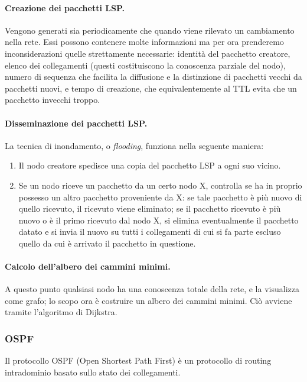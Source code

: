             \paragraph{Creazione dei pacchetti LSP.} Vengono generati sia periodicamente che quando viene rilevato un cambiamento nella rete. Essi possono contenere molte informazioni ma per ora prenderemo inconsiderazioni quelle strettamente necessarie: identità del pacchetto creatore, elenco dei collegamenti (questi costituiscono la conoscenza parziale del nodo), numero di sequenza che facilita la diffusione e la distinzione di pacchetti vecchi da pacchetti nuovi, e tempo di creazione, che equivalentemente al TTL evita che un pacchetto invecchi troppo.
            
            \paragraph{Disseminazione dei pacchetti LSP.} La tecnica di inondamento, o \textit{flooding}, funziona nella seguente maniera:
            \begin{enumerate}
                \item Il nodo creatore spedisce una copia del pacchetto LSP a ogni suo vicino.
                \item Se un nodo riceve un pacchetto da un certo nodo X, controlla se ha in proprio possesso un altro pacchetto proveniente da X: se tale pacchetto è più nuovo di quello ricevuto, il ricevuto viene eliminato; se il pacchetto ricevuto è più nuovo o è il primo ricevuto dal nodo X, si elimina eventualmente il pacchetto datato e si invia il nuovo su tutti i collegamenti di cui si fa parte escluso quello da cui è arrivato il pacchetto in questione.
            \end{enumerate}
            
            \paragraph{Calcolo dell'albero dei cammini minimi.} A questo punto qualsiasi nodo ha una conoscenza totale della rete, e la visualizza come grafo; lo scopo ora è costruire un albero dei cammini minimi. Ciò avviene tramite l'algoritmo di Dijkstra.
            
        \subsubsection{OSPF}
            Il protocollo OSPF (Open Shortest Path First) è un protocollo di routing intradominio basato sullo stato dei collegamenti.
            
